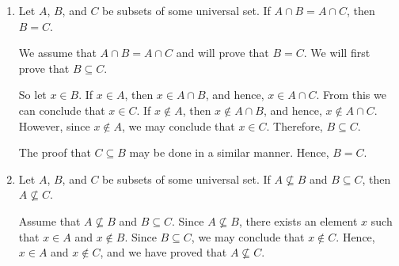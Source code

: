 \begin{enumerate}
\begin{enumerate}
\item Let $A$, $B$, and $C$ be subsets of some universal set.  If $A \cap B = A \cap C$, then $B = C$.

\begin{myproof}
We assume that $A \cap B = A \cap C$ and will prove that $B = C$.  We will first prove that 
$B \subseteq C$.

So let $x \in B$.  If $x \in A$, then $x \in A \cap B$, and hence, $x \in A \cap C$.  From this we can conclude that $x \in C$.  If $x \notin A$, then $x \notin A \cap B$, and hence, 
$x \notin A \cap C$.  However, since $x \notin A$, we may conclude that $x \in C$.  Therefore, 
$B \subseteq C$.

The proof that $C \subseteq B$ may be done in a similar manner.  Hence, $B = C$.
\end{myproof}

\item Let $A$, $B$, and $C$ be subsets of some universal set.  If $A \not \subseteq B$ and 
$B \subseteq C$, then $A \not \subseteq C$.

\begin{myproof}
Assume that $A \not \subseteq B$ and $B \subseteq C$.  Since $A \not \subseteq B$, there exists an element $x$ such that $x \in A$ and $x \notin B$.  Since $B \subseteq C$, we may conclude that 
$x \notin C$.  Hence, $x \in A$ and $x \notin C$, and we have proved that 
$A \not \subseteq C$.
\end{myproof}
\end{enumerate}
\end{enumerate}


